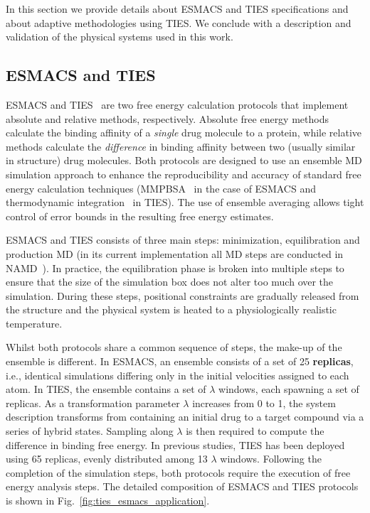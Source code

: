 In this section we provide details about ESMACS and TIES specifications and
about adaptive methodologies using TIES\@. We conclude with a description and
validation of the physical systems used in this work.

\subsection{ESMACS and TIES}\label{ssec:esm_ties}

ESMACS and TIES~\cite{Wan2017brd4, Bhati2017} are two free energy calculation
protocols that implement absolute and relative methods, respectively.
Absolute free energy methods calculate the binding affinity of a
\emph{single} drug molecule to a protein, while relative methods calculate
the \emph{difference} in binding affinity between two (usually similar in
structure) drug molecules. Both protocols are designed to use an ensemble MD
simulation approach to enhance the reproducibility and accuracy of standard
free energy calculation techniques (MMPBSA~\cite{Massova1999} in the case of
ESMACS and thermodynamic integration~\cite{Straatsma1988, Straatsma1991} in
TIES). The use of ensemble averaging allows tight control of error bounds in
the resulting free energy estimates.

ESMACS and TIES consists of three main steps: minimization, equilibration and
production MD (in its current implementation all MD steps are conducted in
NAMD~\cite{Phillips2005}). In practice, the equilibration phase is broken
into multiple steps to ensure that the size of the simulation box does not
alter too much over the simulation. During these steps, positional
constraints are gradually released from the structure and the physical system
is heated to a physiologically realistic temperature.

Whilst both protocols share a common sequence of steps, the make-up of the
ensemble is different. In ESMACS, an ensemble consists of a set of 25
\textbf{replicas}, i.e., identical simulations differing only in the initial
velocities assigned to each atom. In TIES, the ensemble contains a set of
\textbf{$\lambda$} windows, each spawning a set of replicas. As a
transformation parameter $\lambda$ increases from 0 to 1, the system
description transforms from containing an initial drug to a target compound
via a series of hybrid states. Sampling along $\lambda$ is then required to
compute the difference in binding free energy. In previous studies, TIES has
been deployed using 65 replicas, evenly distributed among 13 $\lambda$
windows. Following the completion of the simulation steps, both protocols
require the execution of free energy analysis steps. The detailed composition
of ESMACS and TIES protocols is shown in
Fig.~\ref{fig:ties_esmacs_application}.

